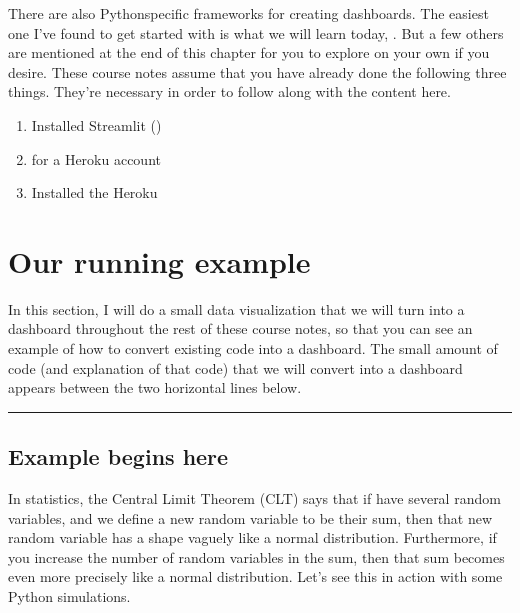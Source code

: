 \documentclass[letterpaper,10pt,english]{sphinxmanual}
\begin{document}
There are also Python\sphinxhyphen{}specific frameworks for creating dashboards.  The easiest one I’ve found to get started with is what we will learn today, .  But a few others are mentioned at the end of this chapter for you to explore on your own if you desire.  These course notes assume that you have already done the following three things.  They’re necessary in order to follow along with the content here.
\begin{enumerate}
%
\item {} 
Installed Streamlit ()

\item {} 
 for a Heroku account

\item {} 
Installed the Heroku 

\end{enumerate}


\section{Our running example}
\label{\detokenize{chapter-14-dashboards:our-running-example}}
In this section, I will do a small data visualization that we will turn into a dashboard throughout the rest of these course notes, so that you can see an example of how to convert existing code into a dashboard.  The small amount of code (and explanation of that code) that we will convert into a dashboard appears between the two horizontal lines below.


\bigskip\hrule\bigskip



\subsection{Example begins here}
\label{\detokenize{chapter-14-dashboards:example-begins-here}}
In statistics, the Central Limit Theorem (CLT) says that if have several random variables, and we define a new random variable to be their sum, then that new random variable has a shape vaguely like a normal distribution.  Furthermore, if you increase the number of random variables in the sum, then that sum becomes even more precisely like a normal distribution.  Let’s see this in action with some Python simulations.
\end{document}
